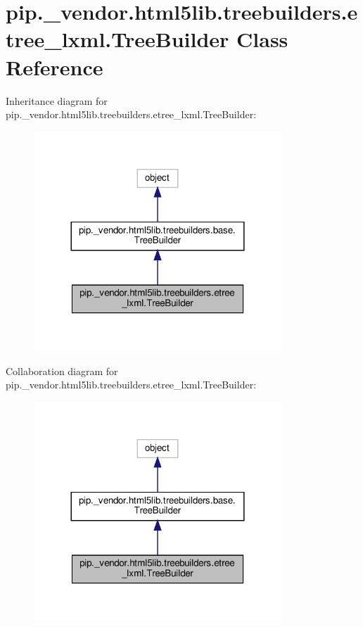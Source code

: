 \hypertarget{classpip_1_1__vendor_1_1html5lib_1_1treebuilders_1_1etree__lxml_1_1TreeBuilder}{}\section{pip.\+\_\+vendor.\+html5lib.\+treebuilders.\+etree\+\_\+lxml.\+Tree\+Builder Class Reference}
\label{classpip_1_1__vendor_1_1html5lib_1_1treebuilders_1_1etree__lxml_1_1TreeBuilder}


Inheritance diagram for pip.\+\_\+vendor.\+html5lib.\+treebuilders.\+etree\+\_\+lxml.\+Tree\+Builder\+:
\nopagebreak
\begin{figure}[H]
\begin{center}
\leavevmode
\includegraphics[width=264pt]{classpip_1_1__vendor_1_1html5lib_1_1treebuilders_1_1etree__lxml_1_1TreeBuilder__inherit__graph}
\end{center}
\end{figure}


Collaboration diagram for pip.\+\_\+vendor.\+html5lib.\+treebuilders.\+etree\+\_\+lxml.\+Tree\+Builder\+:
\nopagebreak
\begin{figure}[H]
\begin{center}
\leavevmode
\includegraphics[width=264pt]{classpip_1_1__vendor_1_1html5lib_1_1treebuilders_1_1etree__lxml_1_1TreeBuilder__coll__graph}
\end{center}
\end{figure}
